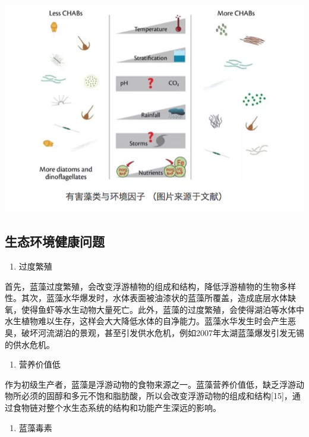 \documentclass[]{book}
\providecommand{\tightlist}{%
  \setlength{\itemsep}{0pt}\setlength{\parskip}{0pt}}
\begin{document}
\includegraphics[width=8.33in]{images/lanzao2}

\hypertarget{ux751fux6001ux73afux5883ux5065ux5eb7ux95eeux9898}{%
\subsection{生态环境健康问题}\label{ux751fux6001ux73afux5883ux5065ux5eb7ux95eeux9898}}

\begin{enumerate}
\def\labelenumi{\arabic{enumi}.}
\tightlist
\item
  过度繁殖
\end{enumerate}

首先，蓝藻过度繁殖，会改变浮游植物的组成和结构，降低浮游植物的生物多样性。其次，蓝藻水华爆发时，水体表面被油漆状的蓝藻所覆盖，造成底层水体缺氧，使得鱼虾等水生动物大量死亡。此外，蓝藻的过度繁殖，会使得湖泊等水体中水生植物难以生存，这样会大大降低水体的自净能力。蓝藻水华发生时会产生恶臭，破坏河流湖泊的景观，甚至引发供水危机，例如2007年太湖蓝藻爆发引发无锡的供水危机。

\begin{enumerate}
\def\labelenumi{\arabic{enumi}.}
\setcounter{enumi}{1}
\tightlist
\item
  营养价值低
\end{enumerate}

作为初级生产者，蓝藻是浮游动物的食物来源之一。蓝藻营养价值低，缺乏浮游动物所必须的固醇和多元不饱和脂肪酸，所以会改变浮游动物的组成和结构{[}15{]}，通过食物链对整个水生态系统的结构和功能产生深远的影响。

\begin{enumerate}
\def\labelenumi{\arabic{enumi}.}
\setcounter{enumi}{2}
\tightlist
\item
  蓝藻毒素
\end{enumerate}
\end{document}
